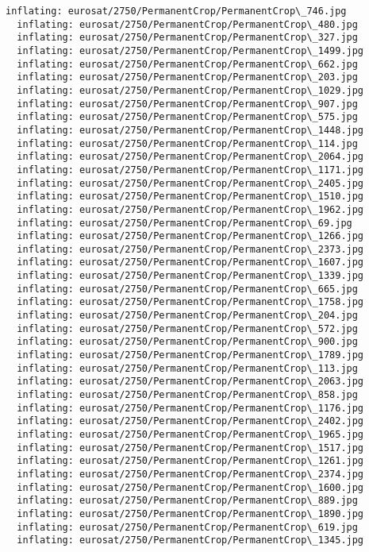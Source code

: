 \documentclass[11pt]{article}
\begin{document}
\begin{Verbatim}[commandchars=\\\{\}]
  inflating: eurosat/2750/PermanentCrop/PermanentCrop\_746.jpg
  inflating: eurosat/2750/PermanentCrop/PermanentCrop\_480.jpg
  inflating: eurosat/2750/PermanentCrop/PermanentCrop\_327.jpg
  inflating: eurosat/2750/PermanentCrop/PermanentCrop\_1499.jpg
  inflating: eurosat/2750/PermanentCrop/PermanentCrop\_662.jpg
  inflating: eurosat/2750/PermanentCrop/PermanentCrop\_203.jpg
  inflating: eurosat/2750/PermanentCrop/PermanentCrop\_1029.jpg
  inflating: eurosat/2750/PermanentCrop/PermanentCrop\_907.jpg
  inflating: eurosat/2750/PermanentCrop/PermanentCrop\_575.jpg
  inflating: eurosat/2750/PermanentCrop/PermanentCrop\_1448.jpg
  inflating: eurosat/2750/PermanentCrop/PermanentCrop\_114.jpg
  inflating: eurosat/2750/PermanentCrop/PermanentCrop\_2064.jpg
  inflating: eurosat/2750/PermanentCrop/PermanentCrop\_1171.jpg
  inflating: eurosat/2750/PermanentCrop/PermanentCrop\_2405.jpg
  inflating: eurosat/2750/PermanentCrop/PermanentCrop\_1510.jpg
  inflating: eurosat/2750/PermanentCrop/PermanentCrop\_1962.jpg
  inflating: eurosat/2750/PermanentCrop/PermanentCrop\_69.jpg
  inflating: eurosat/2750/PermanentCrop/PermanentCrop\_1266.jpg
  inflating: eurosat/2750/PermanentCrop/PermanentCrop\_2373.jpg
  inflating: eurosat/2750/PermanentCrop/PermanentCrop\_1607.jpg
  inflating: eurosat/2750/PermanentCrop/PermanentCrop\_1339.jpg
  inflating: eurosat/2750/PermanentCrop/PermanentCrop\_665.jpg
  inflating: eurosat/2750/PermanentCrop/PermanentCrop\_1758.jpg
  inflating: eurosat/2750/PermanentCrop/PermanentCrop\_204.jpg
  inflating: eurosat/2750/PermanentCrop/PermanentCrop\_572.jpg
  inflating: eurosat/2750/PermanentCrop/PermanentCrop\_900.jpg
  inflating: eurosat/2750/PermanentCrop/PermanentCrop\_1789.jpg
  inflating: eurosat/2750/PermanentCrop/PermanentCrop\_113.jpg
  inflating: eurosat/2750/PermanentCrop/PermanentCrop\_2063.jpg
  inflating: eurosat/2750/PermanentCrop/PermanentCrop\_858.jpg
  inflating: eurosat/2750/PermanentCrop/PermanentCrop\_1176.jpg
  inflating: eurosat/2750/PermanentCrop/PermanentCrop\_2402.jpg
  inflating: eurosat/2750/PermanentCrop/PermanentCrop\_1965.jpg
  inflating: eurosat/2750/PermanentCrop/PermanentCrop\_1517.jpg
  inflating: eurosat/2750/PermanentCrop/PermanentCrop\_1261.jpg
  inflating: eurosat/2750/PermanentCrop/PermanentCrop\_2374.jpg
  inflating: eurosat/2750/PermanentCrop/PermanentCrop\_1600.jpg
  inflating: eurosat/2750/PermanentCrop/PermanentCrop\_889.jpg
  inflating: eurosat/2750/PermanentCrop/PermanentCrop\_1890.jpg
  inflating: eurosat/2750/PermanentCrop/PermanentCrop\_619.jpg
  inflating: eurosat/2750/PermanentCrop/PermanentCrop\_1345.jpg

\end{Verbatim}
\end{document}
